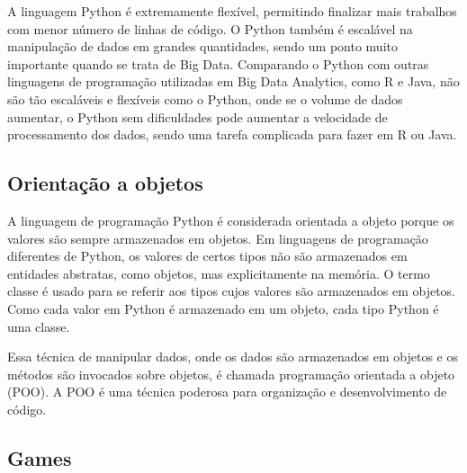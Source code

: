         A linguagem Python é extremamente flexível, permitindo finalizar mais trabalhos com menor número de linhas de código. O Python também é escalável na manipulação de dados em grandes quantidades, sendo um ponto muito importante quando se trata de Big Data. Comparando o Python com outras linguagens de programação utilizadas em Big Data Analytics, como R e Java, não são tão escaláveis e flexíveis como o Python, onde se o volume de dados aumentar, o Python sem dificuldades pode aumentar a velocidade de processamento dos dados, sendo uma tarefa complicada para fazer em R ou Java.

        \subsection{Orientação a objetos}
        A linguagem de programação Python é considerada orientada a objeto porque os valores são
        sempre armazenados em objetos. Em linguagens de programação diferentes de Python, os valores
        de certos tipos não são armazenados em entidades abstratas, como objetos, mas explicitamente na
        memória. O termo classe é usado para se referir aos tipos cujos valores são armazenados em
        objetos. Como cada valor em Python é armazenado em um objeto, cada tipo Python é uma classe. 
        
        Essa técnica de manipular dados, onde os dados são armazenados em objetos e os métodos são invocados sobre objetos, é chamada programação
        orientada a objeto (POO). A POO é uma técnica poderosa para organização e desenvolvimento
        de código. 

        \subsection{Games} 